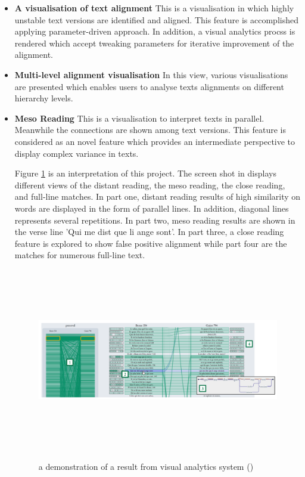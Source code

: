 \begin{itemize}
	\item \textbf{A visualisation of text alignment} This is a visualisation in which highly unstable text versions are identified and aligned. This feature is accomplished applying parameter-driven approach. In addition, a visual analytics procss is rendered which accept tweaking parameters for iterative improvement of the alignment.
	\item \textbf{Multi-level alignment visualisation} In this view, various visualisations are presented which enables users to analyse texts alignments on different hierarchy levels.
	\item \textbf{Meso Reading} This is a visualisation to interpret texts in parallel. Meanwhile the connections are shown among text versions. This feature is considered as an novel feature which provides an intermediate perspective to display complex variance in texts.
	
Figure \ref{fig:mesoReading} is an interpretation of this project. The screen shot in \cite{Stefan2017} displays different views of the distant reading, the meso reading, the close reading, and full-line matches. In part one, distant reading results of high similarity on words are displayed in the form of parallel lines. In addition, diagonal lines represents several repetitions. In part two, meso reading results are shown in the verse line 'Qui me dist que li ange sont'. In part three, a close reading feature is explored to show false positive alignment while part four are the matches for numerous full-line text.
	
	\begin{figure}[h]
		\centering	
		\includegraphics[width=13cm, height=8cm]{Figs/Meso-Reading}\\[1ex]
		\caption{a demonstration of a result from visual analytics system (\cite{Stefan2017})}
		\label{fig:mesoReading}
	\end{figure} 

	
\end{itemize}

